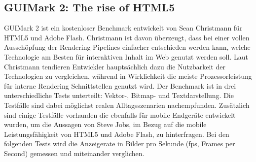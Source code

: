 \subsection{GUIMark 2: The rise of HTML5}
GUIMark 2 ist ein kostenloser Benchmark entwickelt von Sean Christmann für
HTML5 und Adobe Flash. Christmann ist davon überzeugt, dass bei einer vollen
Ausschöpfung der Rendering Pipelines einfacher entschieden werden kann, welche
Technologie am Besten für interaktiven Inhalt im Web genutzt werden soll.
Laut Christmann tendieren Entwickler hauptsächlich dazu die Nutzbarkeit der
Technologien zu vergleichen, während in Wirklichkeit die meiste
Prozessorleistung für interne Rendering Schnittstellen genutzt wird.
\newline\newline
Der Benchmark ist in drei unterschiedliche Tests unterteilt: Vektor-, Bitmap-
und Textdarstellung. Die Testfälle sind dabei möglichst realen
Alltagsszenarien nachempfunden. Zusätzlich sind einige Testfälle vorhanden die
ebenfalls für mobile Endgeräte entwickelt wurden, um die Aussagen von Steve
Jobs, im Bezug auf die mobile Leistungsfähigkeit von HTML5 und Adobe Flash, zu
hinterfragen.
\newline\newline
Bei den folgenden Tests wird die Anzeigerate in Bilder pro Sekunde (fps,
Frames per Second) gemessen und miteinander verglichen.

